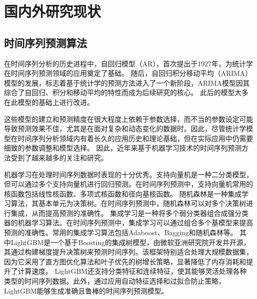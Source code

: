 \section{国内外研究现状}
\subsection{时间序列预测算法}
在时间序列分析的历史进程中，自回归模型\cite{PhysRevE.84.016106}（AR），首次提出于1927年，为统计学在时间序列预测领域的应用奠定了基础。
随后，自回归积分移动平均\cite{jiang2011multifractal}（ARIMA）模型的发展，标志着基于统计学的预测方法进入了一个新阶段，ARIMA模型因其综合了自回归、积分和移动平均的特性而成为后续研究的核心。
此后的模型大多在此模型的基础上进行改进。

这些模型的建立和预测精度在很大程度上依赖于参数选择，而不当的参数设定可能导致预测效果不佳，尤其是在面对复杂和动态变化的数据时。因此，尽管统计学模型在时间序列分析领域内有着长久的应用历史和理论基础，但在实际应用中仍需要细致的参数调整和模型选择。
因此，近年来基于机器学习技术的时间序列预测方法受到了越来越多的关注和研究。

机器学习在处理时间序列数据时表现的十分优秀。支持向量机\cite{zhang2020support}是一种二分类模型，但可以通过多个支持向量机进行回归预测\cite{sapankevych2009time}。在时间序列预测中，支持向量机常用的核函数包括线性核函数、多项式核函数和径向基核函数。
随机森林\cite{genuer2020random}是一种集成学习算法，其基本单元为决策树。在时间序列预测中，随机森林可以对多个决策树进行集成，从而提高预测的准确性\cite{khashei2019comparative}。
集成学习\cite{dong2020survey}是一种将多个弱分类器组合成强分类器的机器学习算法。在时间序列预测中，集成学习可以通过组合多个基模型来提高预测的准确性\cite{galicia2019multi}。常用的集成学习算法包括Adaboost、Bagging和随机森林等。
其中LightGBM\cite{ke2017lightgbm}是一个基于Boosting的集成树模型，由微软亚洲研究院开发并开源，其通过构建梯度提升决策树来预测时间序列。该框架特别适合处理大规模数据集，因为它采用了直方图优化算法和叶子优先的树增长策略，显著降低了内存消耗和提升了计算速度。
LightGBM还支持分类特征和连续特征，使其能够灵活处理各种类型的时间序列数据。此外，通过应用自动特征选择和过拟合防止策略，LightGBM能够生成准确且鲁棒的时间序列预测模型。

